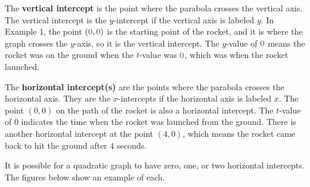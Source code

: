 \documentclass{ximera}
\begin{document}
    
      The \textbf{vertical intercept} is the point where the parabola crosses the vertical axis.
      The vertical intercept is the $y$-intercept if the vertical axis is labeled $y$.
      In Example 1,
      the point $(\firsthighlight{0},\secondhighlight{0})$ is the starting point of the rocket,
      and it is where the graph crosses the $y$-axis,
      so it is the vertical intercept.
      The $y$-value of $\secondhighlight{0}$ means the rocket was on the ground
      when the $t$-value was $\firsthighlight{0}$, which was when the rocket launched.

      The \textbf{horizontal intercept(s)}
      are the points where the parabola crosses the horizontal axis.
      They are the $x$-intercepts if the horizontal axis is labeled $x$.
      The point $(0,0)$ on the path of the rocket is also a horizontal intercept.
      The $t$-value of $0$ indicates the time when the rocket was launched from the ground.
      There is another horizontal intercept at the point $(4,0)$,
      which means the rocket came back to hit the ground after $4$ seconds.
   
      It is possible for a quadratic graph to have zero, one, or two horizontal intercepts.
      The figures below show an example of each.
\end{document}
